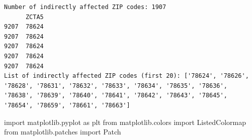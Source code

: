 \documentclass[
  letterpaper,
  DIV=11,
  numbers=noendperiod]{scrartcl}
\newenvironment{Shaded}{\begin{snugshade}}{\end{snugshade}}
\newcommand{\ImportTok}[1]{\textcolor[rgb]{0.00,0.46,0.62}{#1}}
\newcommand{\NormalTok}[1]{\textcolor[rgb]{0.00,0.23,0.31}{#1}}
\begin{document}
\begin{verbatim}
Number of indirectly affected ZIP codes: 1907
      ZCTA5
9207  78624
9207  78624
9207  78624
9207  78624
9207  78624
List of indirectly affected ZIP codes (first 20): ['78624', '78626', '78628', '78631', '78632', '78633', '78634', '78635', '78636', '78638', '78639', '78640', '78641', '78642', '78643', '78645', '78654', '78659', '78661', '78663']
\end{verbatim}

\begin{Shaded}
\begin{Highlighting}[]
\ImportTok{import}\NormalTok{ matplotlib.pyplot }\ImportTok{as}\NormalTok{ plt}
\ImportTok{from}\NormalTok{ matplotlib.colors }\ImportTok{import}\NormalTok{ ListedColormap}
\ImportTok{from}\NormalTok{ matplotlib.patches }\ImportTok{import}\NormalTok{ Patch}
\end{Highlighting}
\end{Shaded}
\end{document}
